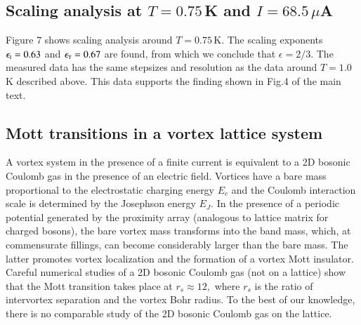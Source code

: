 \documentclass[aps,twocolumn,prl,10pt,amsmath,amssymb,nofootinbib,showpacs,superscriptaddress,floatfix]{revtex4-1}
\newcommand{\rs}{\rm\scriptscriptstyle}
\begin{document}
\subsection{Scaling analysis at $T=0.75$\,K and $I=68.5\,\mu$A}
Figure 7 shows scaling analysis around $T = 0.75\,$K. The scaling exponents $\epsilon_{\rs I}=0.63$ and $\epsilon_{\rs T}=0.67$ are found, from which we conclude that $\epsilon = 2/3$. The measured data has the same stepsizes and resolution as the data around $T = 1.0\,$K described above. This data supports the finding shown in Fig.4 of the main text.

\newpage

\subsection{Mott transitions in a vortex lattice system}
A vortex system in the presence of a finite current is equivalent
to a 2D bosonic Coulomb gas in the presence of an electric field.
Vortices have a bare mass proportional to the electrostatic charging
energy $E_{c}$ and the Coulomb interaction scale is determined by
the Josephson energy $E_{J}.$ In the presence of a periodic potential generated by the 
proximity array (analogous to lattice matrix for charged bosons), the bare vortex mass
transforms into the band
mass, which, at commensurate fillings, can become considerably larger than the bare mass.
The latter promotes vortex localization and the formation of a vortex Mott insulator. 
Careful numerical studies
\cite{ceperley} of a 2D bosonic Coulomb gas (not on a lattice) show
that the Mott transition takes place at $r_{s}\approx12,$ where $r_{s}$
is the ratio of intervortex separation and the vortex Bohr radius.
To the best of our knowledge, there is no comparable study of the 2D bosonic Coulomb
gas on the lattice. 
\end{document}
